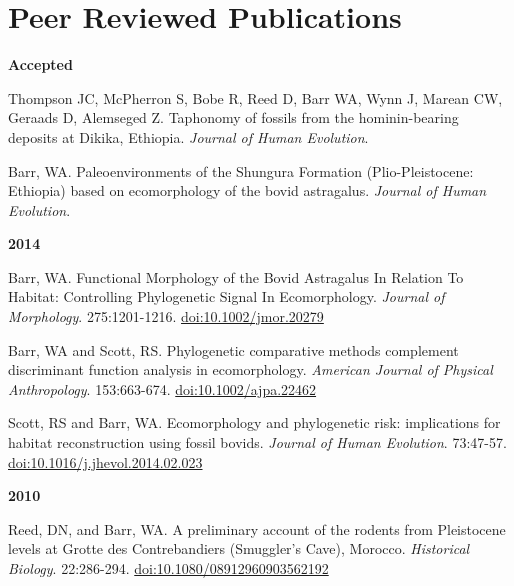 \documentclass{article}
\begin{document}
\section*{Peer Reviewed Publications}

\begin{description*}
\item[] {\bfseries Accepted}
\item[] Thompson JC, McPherron S, Bobe R, Reed D, Barr WA, Wynn J, Marean CW, Geraads D, Alemseged Z. Taphonomy of fossils from the hominin-bearing deposits at Dikika, Ethiopia. \emph{Journal of Human Evolution}.
\item[] Barr, WA. Paleoenvironments of the Shungura Formation (Plio-Pleistocene: Ethiopia) based on ecomorphology of the bovid astragalus. \emph{Journal of Human Evolution}.
\end{description*}


\begin{description*}
\item[] {\bfseries 2014}
\item[] Barr, WA. Functional Morphology of the Bovid Astragalus In Relation To Habitat: Controlling Phylogenetic Signal In Ecomorphology. \emph{Journal
of Morphology}. 275:1201-1216. \href{http://dx.doi.org/10.1002/jmor.20279}{doi:10.1002/jmor.20279}

\item[] Barr, WA and Scott, RS. Phylogenetic comparative methods complement discriminant function analysis in ecomorphology. \emph{American Journal
of Physical Anthropology}. 153:663-674. \href{http://dx.doi.org/10.1002/ajpa.22462}{doi:10.1002/ajpa.22462}

\item[] Scott, RS and Barr, WA. Ecomorphology and phylogenetic risk: implications for habitat reconstruction using fossil bovids.
\emph{Journal of Human Evolution}. 73:47-57. \href{http://dx.doi.org/10.1016/j.jhevol.2014.02.023}{doi:10.1016/j.jhevol.2014.02.023}

\end{description*}

\begin{description*}
\item[] {\bfseries 2010}
\item[] Reed, DN, and Barr, WA. A preliminary account of the rodents from Pleistocene levels at Grotte des Contrebandiers (Smuggler's Cave),
Morocco. \emph{Historical Biology}. 22:286-294. \href{http://dx.doi.org/10.1080/08912960903562192}{doi:10.1080/08912960903562192}
\end{description*}
\end{document}
